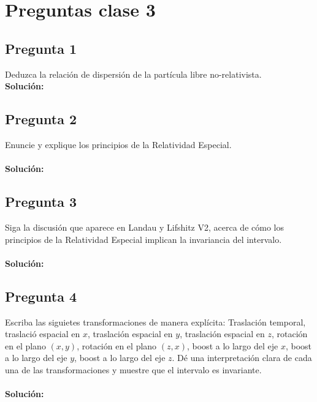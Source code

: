 \documentclass[../main.tex]{subfiles}
\begin{document}
\section{Preguntas clase 3}
\subsection{Pregunta 1}
Deduzca la relación de dispersión de la partícula libre no-relativista. \\
\textbf{Solución:}
\\
\subsection{Pregunta 2}
Enuncie y explique los principios de la Relatividad Especial. \\
\\
\textbf{Solución:}
\subsection{Pregunta 3}
Siga la discusión que aparece en Landau y Lifshitz V2, acerca de cómo los principios de la Relatividad Especial implican la invariancia del intervalo. \\
\\
\textbf{Solución:}
\subsection{Pregunta 4}
Escriba las siguietes transformaciones de manera explícita: Traslación temporal, traslació espacial en $x$, traslación espacial en $y$, traslación espacial en $z$, rotación en el plano $(x,y)$, rotación en el plano $(z,x)$, boost a lo largo del eje $x$, boost a lo largo del eje $y$, boost a lo largo del eje $z$. Dé una interpretación clara de cada una de las transformaciones y muestre que el intervalo es invariante.\\
\\
\textbf{Solución:}
  





 
\end{document}

